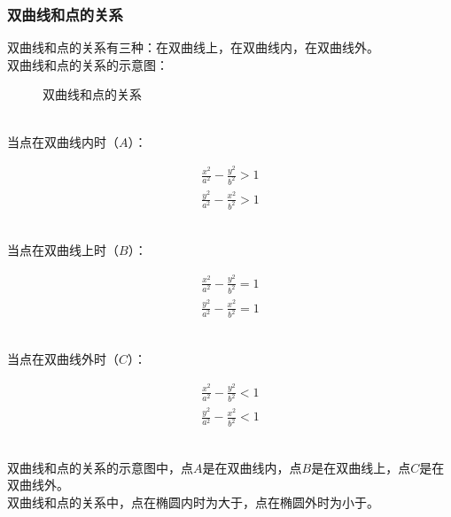 \documentclass[UTF8]{ctexart}
\begin{document}
\subsubsection{双曲线和点的关系}
    双曲线和点的关系有三种：在双曲线上，在双曲线内，在双曲线外。\\[3mm]
    双曲线和点的关系的示意图：
    \begin{figure}[h!]
        \begin{center}
            \caption{双曲线和点的关系}
        \end{center}
    \end{figure}\\
    当点在双曲线内时（$A$）：
    \begin{large}
        \begin{align*}
            \frac{x^2}{a^2}-\frac{y^2}{b^2}>1\\[4mm]
            \frac{y^2}{a^2}-\frac{x^2}{b^2}>1
        \end{align*}
    \end{large}\\
    当点在双曲线上时（$B$）：
    \begin{large}
        \begin{align*}
            \frac{x^2}{a^2}-\frac{y^2}{b^2}=1\\[4mm]
            \frac{y^2}{a^2}-\frac{x^2}{b^2}=1
        \end{align*}
    \end{large}\\
    当点在双曲线外时（$C$）：
    \begin{large}
        \begin{align*}
            \frac{x^2}{a^2}-\frac{y^2}{b^2}<1\\[4mm]
            \frac{y^2}{a^2}-\frac{x^2}{b^2}<1
        \end{align*}
    \end{large}\\
    双曲线和点的关系的示意图中，点$A$是在双曲线内，点$B$是在双曲线上，点$C$是在双曲线外。\\[3mm]
    双曲线和点的关系中，点在椭圆内时为大于，点在椭圆外时为小于。
\end{document}
